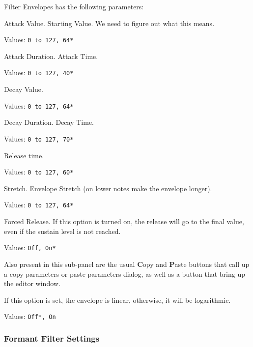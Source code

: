    Filter Envelopes has the following parameters:

   \setcounter{ItemCounter}{0}      %

   Attack Value.  Starting Value.
   We need to figure out what this means.

   Values: \texttt{0 to 127, 64*}

   Attack Duration.  Attack Time.

   Values: \texttt{0 to 127, 40*}

   Decay Value.

   Values: \texttt{0 to 127, 64*}

   Decay Duration.  Decay Time.

   Values: \texttt{0 to 127, 70*}

   Release time.

   Values: \texttt{0 to 127, 60*}

   Stretch.
   Envelope Stretch (on lower notes make the envelope longer).

   Values: \texttt{0 to 127, 64*}

   Forced Release.
   If this option is turned on, the release will go to the
   final value, even if the sustain level is not reached.

   Values: \texttt{Off, On*}

   Also present in this sub-panel are the usual \textbf{C}opy
   and \textbf{P}aste buttons that call up a copy-parameters or
   paste-parameters dialog, as well as a button that bring up the editor
   window.


   If this option is set, the envelope is linear, otherwise, it will be
   logarithmic.

   Values: \texttt{Off*, On}

\subsubsection{Formant Filter Settings}
\label{subsubsec:formant_filter_settings}


